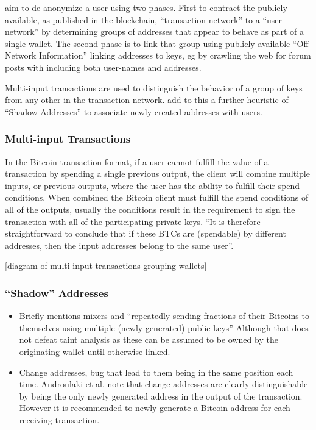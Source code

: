 \textcite{reid-anon} aim to de-anonymize a user using two phases.  First to
contract the publicly available, as published in the blockchain, ``transaction
network'' to a ``user network'' by determining groups of addresses that appear to
behave as part of a single wallet.  The second phase is to  link that group
using publicly available ``Off-Network Information'' linking addresses to keys,
eg by crawling the web for forum posts with including both user-names and
addresses.

Multi-input transactions are used to distinguish the behavior of a group of keys
from any other in the transaction network.  \textcite{eval-priv} add to this a further
heuristic of ``Shadow Addresses'' to associate newly created addresses with
users.

\subsubsection{Multi-input Transactions}
In the Bitcoin transaction format, if a user cannot fulfill the value of a
transaction by spending a single previous output, the client will combine
multiple inputs, or previous outputs, where the user has the ability to fulfill
their spend conditions.  When combined the Bitcoin client must fulfill the spend
conditions of all of the outputs, usually the conditions result in the requirement to sign
the transaction with all of the participating private keys.  ``It is therefore
straightforward to conclude that if these BTCs are (spendable) by different addresses,
then the input addresses belong to the same user''\cite{eval-priv}.

[diagram of multi input transactions grouping wallets]

\subsubsection{``Shadow'' Addresses}


\begin{itemize} \item Briefly mentions mixers and ``repeatedly sending fractions
        of their Bitcoins to themselves using multiple (newly generated)
    public-keys'' Although that does not defeat taint analysis as these can be
assumed to be owned by the originating wallet until otherwise linked.  \item
    Change addresses, bug that lead to them being in the same position each
    time.  Androulaki et al, note that change addresses are clearly
    distinguishable by being the only newly generated address in the output of
    the transaction.  However it is recommended to newly generate a Bitcoin
    address for each receiving transaction.  \end{itemize}

